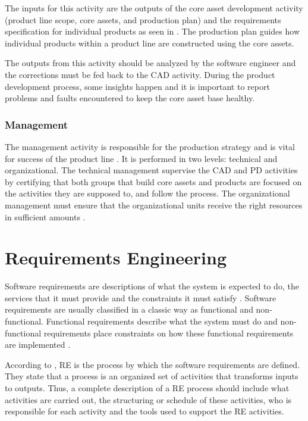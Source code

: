 The inputs for this activity are the outputs of the core asset development activity (product line scope, 
core assets, and production plan) and the requirements specification for individual products as seen in 
. The production plan guides how individual products within a product line are constructed using 
the core assets.

The outputs from this activity should be analyzed by the software engineer and the corrections must be fed 
back to the \acf{CAD} activity. During the product development process, some insights happen 
and it is important to report problems and faults encountered to keep the core asset base healthy.

\subsubsection{Management}

The management activity is responsible for the production strategy and is vital
for success of the product line \citep{Pohl2005}. It is performed in two levels: technical and 
organizational. The technical management supervise the CAD and PD activities by certifying that both 
groups that build core assets and products are focused on the activities they are supposed to, and follow 
the process. The organizational management must ensure that the organizational units receive the right 
resources in sufficient amounts \citep{clements2002software}.

\section{Requirements Engineering}
\label{sc:requirementsengineering}

Software requirements are descriptions of what the system is expected to do, the
services that it must provide and the constraints it must satisfy
\citep{Sommerville2011}.
Software requirements are usually classified in a classic way as functional and non-functional. 
Functional requirements describe what the system must do and non-functional requirements place constraints 
on how these functional requirements are implemented
\citep{sommerville2005integrated}.

According to \citep{sommerville1998requirements},
\acf{RE} is the process by which the  software requirements are defined. They
state that a process is an organized set of activities that transforms inputs to 
outputs. Thus, a complete description of a \ac{RE} process should include what
activities are carried out, the structuring or schedule of these activities, who is responsible for each 
activity and the tools used to support the \ac{RE} activities.   

